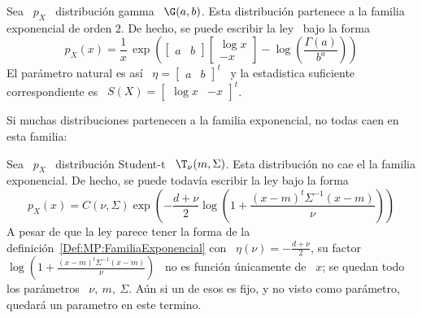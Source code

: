 \begin{ejemplo}
  Sea \ $p_X$ \ distribuci\'on gamma \ $\G(a,b)$.  Esta distribuci\'on partenece
  a la familia exponencial  de orden $2$.  De hecho, se puede  escribir la ley \
  bajo la forma
  \[
  p_X(x)     =    \frac{1}{x}    \,     \exp\left(    \begin{bmatrix}     a    &
      b \end{bmatrix} \begin{bmatrix}  \log x \\ - x  \end{bmatrix} - \log\left(
      \frac{\Gamma(a)}{b^a} \right)\right)
  \]
  El   par\'ametro  natural   es   as\'i   \  $\eta   =   \begin{bmatrix}  a   &
    b \end{bmatrix}^t$ \ y la  estadistica suficiente correspondiente es \ $S(X)
  = \begin{bmatrix} \log x & - x \end{bmatrix}^t$.
\end{ejemplo}

Si muchas distribuciones  partenecen a la familia exponencial,  no todas caen en
esta familia:
%
\begin{ejemplo}
  Sea \ $p_X$ \ distribuci\'on  Student-t \ $\T_\nu(m,\Sigma)$. Esta distribuci\'on no
  cae el  la familia exponencial. De  hecho, se puede todav\'ia  escribir la ley
  bajo la forma
  \[
  p_X(x)   =  C(\nu,\Sigma)   \exp\left(  -   \frac{d+\nu}{2}  \log\left(   1  +
      \frac{(x-m)^t \Sigma^{-1} (x-m)}{\nu} \right) \right)
  \]
  A    pesar   de    que    la   ley    parece    tener   la    forma   de    la
  definici\'on~\ref{Def:MP:FamiliaExponencial}    con   \    $\eta(\nu)    =   -
  \frac{d+\nu}{2}$,  su  factor  \  $\log\left( 1  +  \frac{(x-m)^t  \Sigma^{-1}
      (x-m)}{\nu} \right)$  \ no es funci\'on  \'unicamente de \  $x$; se quedan
  todo los par\'ametros \ $\nu, \: m, \: \Sigma$. A\'un si un de esos es fijo, y
  no visto como par\'ametro, quedar\'a un parametro en este termino.
\end{ejemplo}

